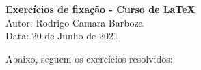 \documentclass[12pt, a4paper]{article}
\begin{document}
\begin{center}
{\large\textbf{Exercícios de fixação - Curso de LaTeX}}\\
\vspace{0.3cm}
Autor: Rodrigo Camara Barboza\\
\vspace{0.3cm}
Data: 20 de Junho de 2021
\end{center}

\vspace{0.5cm}

Abaixo, seguem os exercícios resolvidos:
\end{document}
